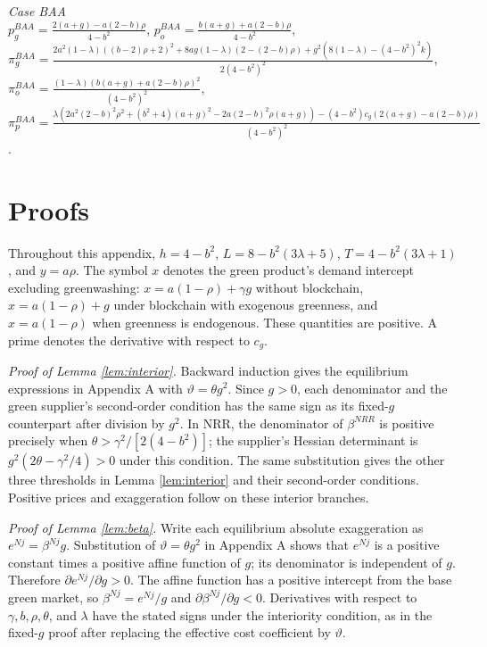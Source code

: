 \documentclass[preprint,review,12pt,authoryear,nopreprintline]{elsarticle}
\theoremstyle{definition}
\begin{document}
\vspace{0.3cm}
\noindent\textit{Case BAA}\\
$p_g^{BAA}=\frac{2 (a+g)-a (2-b) \rho }{4-b^2}$,
$p_o^{BAA}=\frac{b (a+g)+a (2-b) \rho }{4-b^2}$,\\
$\pi_g^{BAA}=\frac{2 a^2 (1-\lambda ) ((b-2) \rho +2)^2+8 a g (1-\lambda ) (2-(2-b) \rho )+g^2 \left(8 (1-\lambda )-\left(4-b^2\right)^2 k\right)}{2 \left(4-b^2\right)^2}$,
$\pi_o^{BAA}=\frac{(1-\lambda ) (b (a+g)+a (2-b) \rho )^2}{\left(4-b^2\right)^2}$,\\
$\pi_p^{BAA}=\frac{\lambda  \left(2 a^2 (2-b)^2 \rho ^2+\left(b^2+4\right) (a+g)^2-2 a (2-b)^2 \rho  (a+g)\right)-\left(4-b^2\right) c_g (2 (a+g)-a (2-b) \rho )}{\left(4-b^2\right)^2}$.

\endgroup

\section{Proofs}\label{app:B}

\noindent Throughout this appendix, $h=4-b^2$, $L=8-b^2(3\lambda+5)$, $T=4-b^2(3\lambda+1)$, and $y=a\rho$. The symbol $x$ denotes the green product's demand intercept excluding greenwashing: $x=a(1-\rho)+\gamma g$ without blockchain, $x=a(1-\rho)+g$ under blockchain with exogenous greenness, and $x=a(1-\rho)$ when greenness is endogenous. These quantities are positive. A prime denotes the derivative with respect to $c_g$.

\noindent \textit{Proof of Lemma \ref{lem:interior}.}
Backward induction gives the equilibrium expressions in Appendix A with $\vartheta=\theta g^2$. Since $g>0$, each denominator and the green supplier's second-order condition has the same sign as its fixed-$g$ counterpart after division by $g^2$. In NRR, the denominator of $\beta^{NRR}$ is positive precisely when $\theta>\gamma^2/[2(4-b^2)]$; the supplier's Hessian determinant is $g^2(2\theta-\gamma^2/4)>0$ under this condition. The same substitution gives the other three thresholds in Lemma \ref{lem:interior} and their second-order conditions. Positive prices and exaggeration follow on these interior branches.

\noindent \textit{Proof of Lemma \ref{lem:beta}.}
Write each equilibrium absolute exaggeration as $e^{Nj}=\beta^{Nj}g$. Substitution of $\vartheta=\theta g^2$ in Appendix A shows that $e^{Nj}$ is a positive constant times a positive affine function of $g$; its denominator is independent of $g$. Therefore $\partial e^{Nj}/\partial g>0$. The affine function has a positive intercept from the base green market, so $\beta^{Nj}=e^{Nj}/g$ and $\partial\beta^{Nj}/\partial g<0$. Derivatives with respect to $\gamma,b,\rho,\theta$, and $\lambda$ have the stated signs under the interiority condition, as in the fixed-$g$ proof after replacing the effective cost coefficient by $\vartheta$.
\end{document}
